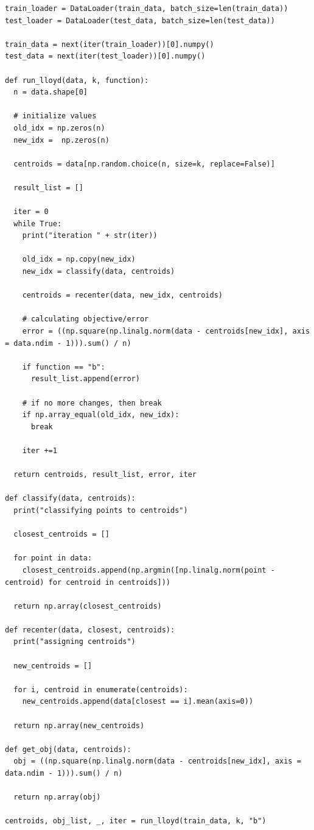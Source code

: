 \documentclass{article}
\newcommand{\1}{\mathbf{1}}
\begin{document}
{\begin{verbatim}
train_loader = DataLoader(train_data, batch_size=len(train_data))
test_loader = DataLoader(test_data, batch_size=len(test_data))

train_data = next(iter(train_loader))[0].numpy()
test_data = next(iter(test_loader))[0].numpy()

def run_lloyd(data, k, function):
  n = data.shape[0]

  # initialize values
  old_idx = np.zeros(n)
  new_idx =  np.zeros(n)

  centroids = data[np.random.choice(n, size=k, replace=False)]

  result_list = []

  iter = 0
  while True:
    print("iteration " + str(iter))

    old_idx = np.copy(new_idx)
    new_idx = classify(data, centroids)

    centroids = recenter(data, new_idx, centroids)

    # calculating objective/error  
    error = ((np.square(np.linalg.norm(data - centroids[new_idx], axis = data.ndim - 1))).sum() / n)

    if function == "b":
      result_list.append(error)

    # if no more changes, then break
    if np.array_equal(old_idx, new_idx):
      break

    iter +=1
  
  return centroids, result_list, error, iter

def classify(data, centroids):
  print("classifying points to centroids")

  closest_centroids = []

  for point in data:
    closest_centroids.append(np.argmin([np.linalg.norm(point - centroid) for centroid in centroids]))

  return np.array(closest_centroids)

def recenter(data, closest, centroids):
  print("assigning centroids")
  
  new_centroids = []

  for i, centroid in enumerate(centroids):
    new_centroids.append(data[closest == i].mean(axis=0))

  return np.array(new_centroids)

def get_obj(data, centroids):
  obj = ((np.square(np.linalg.norm(data - centroids[new_idx], axis = data.ndim - 1))).sum() / n)

  return np.array(obj)

centroids, obj_list, _, iter = run_lloyd(train_data, k, "b")


\end{verbatim}}
\end{document}
